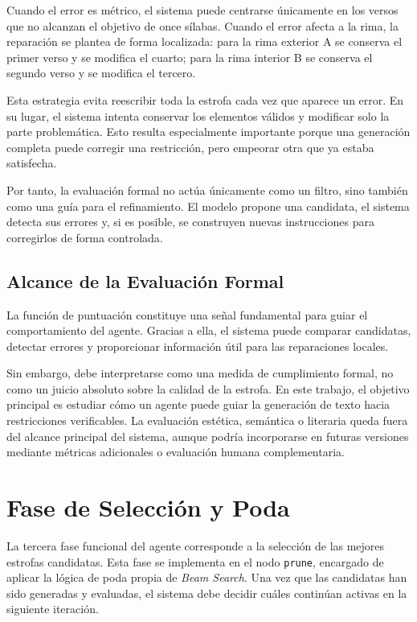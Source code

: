 \documentclass[12pt,a4paper,twoside,openright]{book}
\begin{document}
Cuando el error es métrico, el sistema puede centrarse únicamente en los versos que no alcanzan el objetivo de once sílabas. Cuando el error afecta a la rima,
la reparación se plantea de forma localizada: para la rima exterior A se conserva el primer verso y se modifica el cuarto; para la rima interior B se conserva el segundo verso y se modifica el tercero.

Esta estrategia evita reescribir toda la estrofa cada vez que aparece un error. En su lugar, el sistema intenta conservar los elementos válidos y modificar solo la parte problemática.
Esto resulta especialmente importante porque una generación completa puede corregir una restricción, pero empeorar otra que ya estaba satisfecha.

Por tanto, la evaluación formal no actúa únicamente como un filtro, sino también como una guía para el refinamiento.
El modelo propone una candidata, el sistema detecta sus errores y, si es posible, se construyen nuevas instrucciones para corregirlos de forma controlada.


\subsection{Alcance de la Evaluación Formal}

La función de puntuación constituye una señal fundamental para guiar el comportamiento del agente. Gracias a ella, el sistema puede comparar candidatas, detectar errores y proporcionar información útil para las reparaciones locales.

Sin embargo, debe interpretarse como una medida de cumplimiento formal, no como un juicio absoluto sobre la calidad de la estrofa.
En este trabajo, el objetivo principal es estudiar cómo un agente puede guiar la generación de texto hacia restricciones verificables. La evaluación estética, semántica o literaria queda fuera del alcance principal del sistema,
aunque podría incorporarse en futuras versiones mediante métricas adicionales o evaluación humana complementaria.




\section{Fase de Selección y Poda} %

La tercera fase funcional del agente corresponde a la selección de las mejores estrofas candidatas. Esta fase se implementa en el nodo \texttt{prune}, encargado de aplicar la lógica de poda propia de \emph{Beam Search}.
Una vez que las candidatas han sido generadas y evaluadas, el sistema debe decidir cuáles continúan activas en la siguiente iteración.
\end{document}
